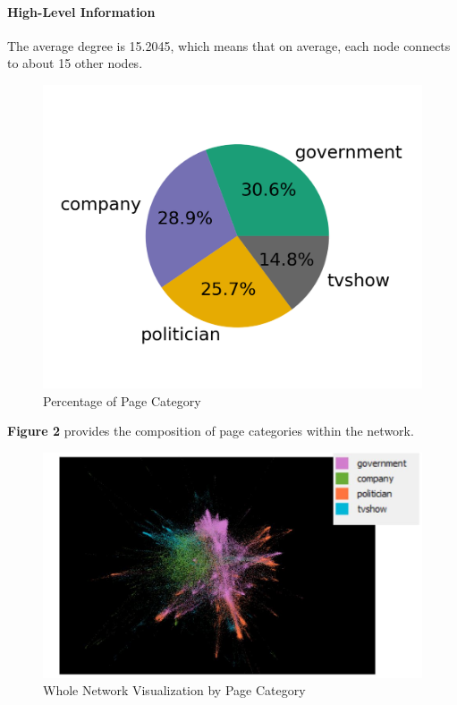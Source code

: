 \documentclass[11pt,twocolumn]{article}
\begin{document}
\paragraph{High-Level Information} 
The average degree is 15.2045, which means that on average, each node connects to about 15 other nodes. 

\begin{figure}[hbt!]
\includegraphics[scale=0.2]{pie_chart_category.png} 
\caption{Percentage of Page Category}
\end{figure}

\textbf{Figure 2} provides the composition of page categories within the network.


\begin{figure}[hbt!]
\includegraphics[scale=0.35]{gephi_whole_network_composition.JPG} 
\caption{Whole Network Visualization by Page Category}
\end{figure}
\end{document}

